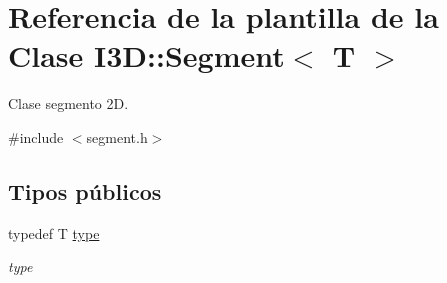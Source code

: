 \hypertarget{class_i3_d_1_1_segment}{}\section{Referencia de la plantilla de la Clase I3D\+:\+:Segment$<$ T $>$}
\label{class_i3_d_1_1_segment}


Clase segmento 2D.  




{\ttfamily \#include $<$segment.\+h$>$}

\subsection*{Tipos públicos}
\begin{DoxyCompactItemize}
\item 
typedef T \hyperlink{class_i3_d_1_1_segment_abc51866dd6396476534bda5afd87faf9}{type}
\begin{DoxyCompactList}\small\item\em type \end{DoxyCompactList}\end{DoxyCompactItemize}
